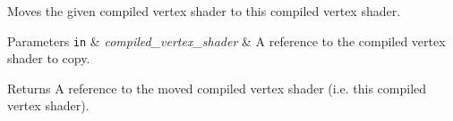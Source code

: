 Moves the given compiled vertex shader to this compiled vertex shader.


\begin{DoxyParams}[1]{Parameters}
\mbox{\tt in}  & {\em compiled\+\_\+vertex\+\_\+shader} & A reference to the compiled vertex shader to copy. \\
\hline
\end{DoxyParams}
\begin{DoxyReturn}{Returns}
A reference to the moved compiled vertex shader (i.\+e. this compiled vertex shader). 
\end{DoxyReturn}
